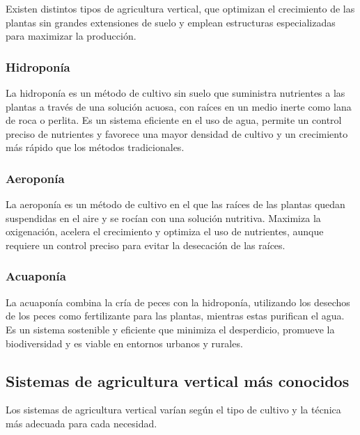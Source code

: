 
Existen distintos tipos de agricultura vertical, que optimizan el crecimiento de las plantas sin grandes extensiones de suelo y emplean estructuras especializadas para maximizar la producción.

\subsubsection{Hidroponía}
La hidroponía es un método de cultivo sin suelo que suministra nutrientes a las plantas a través de una solución acuosa, con raíces en un medio inerte como lana de roca o perlita. Es un sistema eficiente en el uso de agua, permite un control preciso de nutrientes y favorece una mayor densidad de cultivo y un crecimiento más rápido que los métodos tradicionales.
\subsubsection{Aeroponía}
La aeroponía es un método de cultivo en el que las raíces de las plantas quedan suspendidas en el aire y se rocían con una solución nutritiva. Maximiza la oxigenación, acelera el crecimiento y optimiza el uso de nutrientes, aunque requiere un control preciso para evitar la desecación de las raíces.
\subsubsection{Acuaponía}
La acuaponía combina la cría de peces con la hidroponía, utilizando los desechos de los peces como fertilizante para las plantas, mientras estas purifican el agua. Es un sistema sostenible y eficiente que minimiza el desperdicio, promueve la biodiversidad y es viable en entornos urbanos y rurales.


\subsection{Sistemas de agricultura vertical más conocidos}
Los sistemas de agricultura vertical varían según el tipo de cultivo y la técnica más adecuada para cada necesidad.

